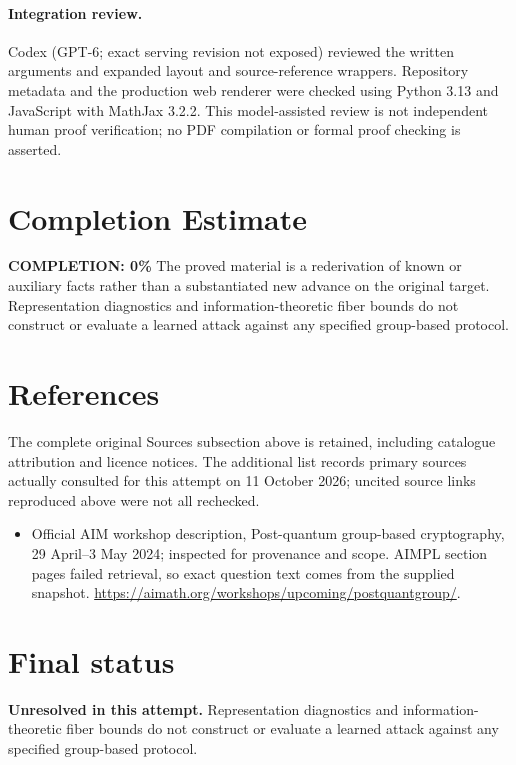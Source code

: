 \documentclass[11pt]{article}
\begin{document}
\paragraph{Integration review.} Codex (GPT-6; exact serving revision not exposed) reviewed the written arguments and expanded layout and source-reference wrappers. Repository metadata and the production web renderer were checked using Python 3.13 and JavaScript with MathJax 3.2.2. This model-assisted review is not independent human proof verification; no PDF compilation or formal proof checking is asserted.

\section{Completion Estimate}
\noindent\textbf{COMPLETION: 0\%}
The proved material is a rederivation of known or auxiliary facts rather than a substantiated new advance on the original target. Representation diagnostics and information-theoretic fiber bounds do not construct or evaluate a learned attack against any specified group-based protocol.
\section{References}
The complete original Sources subsection above is retained, including catalogue attribution and licence notices. The additional list records primary sources actually consulted for this attempt on 11 October 2026; uncited source links reproduced above were not all rechecked.
\begin{itemize}
\item Official AIM workshop description, Post-quantum group-based cryptography, 29 April--3 May 2024; inspected for provenance and scope. AIMPL section pages failed retrieval, so exact question text comes from the supplied snapshot. \url{https://aimath.org/workshops/upcoming/postquantgroup/}.
\end{itemize}
\section{Final status}
\textbf{Unresolved in this attempt.} Representation diagnostics and information-theoretic fiber bounds do not construct or evaluate a learned attack against any specified group-based protocol.
\end{document}
